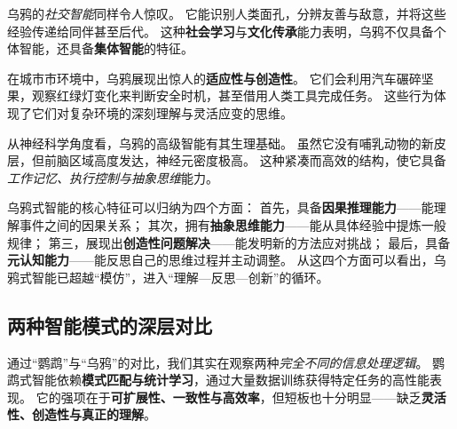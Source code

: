 
乌鸦的\emph{社交智能}同样令人惊叹。  
它能识别人类面孔，分辨友善与敌意，并将这些经验传递给同伴甚至后代。  
这种\textbf{社会学习}与\textbf{文化传承}能力表明，乌鸦不仅具备个体智能，还具备\textbf{集体智能}的特征。  


在城市市环境中，乌鸦展现出惊人的\textbf{适应性与创造性}。  
它们会利用汽车碾碎坚果，观察红绿灯变化来判断安全时机，甚至借用人类工具完成任务。  
这些行为体现了它们对复杂环境的深刻理解与灵活应变的思维。  


从神经科学角度看，乌鸦的高级智能有其生理基础。  
虽然它没有哺乳动物的新皮层，但前脑区域高度发达，神经元密度极高。  
这种紧凑而高效的结构，使它具备\emph{工作记忆、执行控制与抽象思维}能力。  


乌鸦式智能的核心特征可以归纳为四个方面：  
首先，具备\textbf{因果推理能力}——能理解事件之间的因果关系；  
其次，拥有\textbf{抽象思维能力}——能从具体经验中提炼一般规律；  
第三，展现出\textbf{创造性问题解决}——能发明新的方法应对挑战；  
最后，具备\textbf{元认知能力}——能反思自己的思维过程并主动调整。  
从这四个方面可以看出，乌鸦式智能已超越“模仿”，进入“理解—反思—创新”的循环。  


\subsection{两种智能模式的深层对比}

通过“鹦鹉”与“乌鸦”的对比，我们其实在观察两种\emph{完全不同的信息处理逻辑}。  
鹦鹉式智能依赖\textbf{模式匹配与统计学习}，通过大量数据训练获得特定任务的高性能表现。  
它的强项在于\textbf{可扩展性、一致性与高效率}，但短板也十分明显——缺乏\textbf{灵活性、创造性与真正的理解}。  

